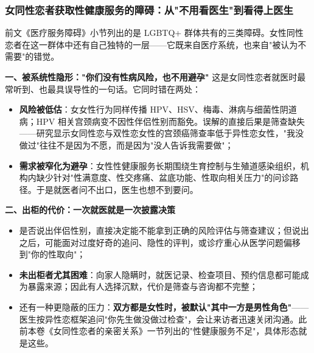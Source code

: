 \subsubsection{女同性恋者获取性健康服务的障碍：从"不用看医生"到看得上医生}

前文《医疗服务障碍》小节列出的是 LGBTQ+ 群体共有的三类障碍。女性同性恋者在这一群体中还有自己独特的一层——它既来自医疗系统，也来自"被认为不需要"的错觉。

\textbf{一、被系统性隐形："你们没有性病风险，也不用避孕" }
这是女同性恋者就医时最常听到、也最具误导性的一句话。它同时错在两处：
\begin{itemize}
\item \textbf{风险被低估}：女女性行为同样传播 HPV、HSV、梅毒、淋病与细菌性阴道病；HPV 相关宫颈病变不因性伴侣性别而豁免。误解的直接后果是筛查缺失——研究显示女同性恋与双性恋女性的宫颈癌筛查率低于异性恋女性，"我没做过"往往不是因为不愿，而是因为"没人告诉我需要做"；
\item \textbf{需求被窄化为避孕}：女性性健康服务长期围绕生育控制与生殖道感染组织，机构内缺少针对"性满意度、性交疼痛、盆底功能、性取向相关压力"的问诊路径。于是就医者问不出口，医生也想不到要问。
\end{itemize}

\textbf{二、出柜的代价：一次就医就是一次披露决策}
\begin{itemize}
\item 是否说出伴侣性别，直接决定能不能拿到正确的风险评估与筛查建议；但说出之后，可能面对过度好奇的追问、隐性的评判，或诊疗重心从医学问题偏移到"你的性取向"；
\item \textbf{未出柜者尤其困难}：向家人隐瞒时，就医记录、检查项目、预约信息都可能成为暴露来源；因此有人选择沉默，代价是筛查与咨询都不完整；
\item 还有一种更隐蔽的压力：\textbf{双方都是女性时，被默认"其中一方是男性角色"}——医生按异性恋框架追问"你先生做没做过检查"，会让来访者迅速关闭沟通。此前本卷《女同性恋者的亲密关系》一节列出的"性健康服务不足"，具体形态就是这些。
\end{itemize}

